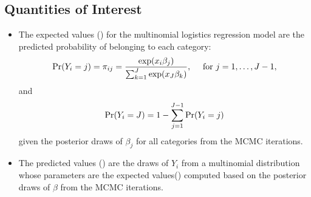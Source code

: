 \documentclass[letterpaper,10pt,english]{sphinxmanual}
\begin{document}
\subsection{Quantities of Interest}
\label{vignette:id87}\begin{itemize}
\item {} 
The expected values () for the multinomial logistics
regression model are the predicted probability of belonging to each
category:
\begin{gather}
\begin{split}\begin{aligned}
\Pr(Y_i=j)=\pi_{ij}=\frac{\exp(x_i \beta_j)}{\sum_{k=1}^J \exp(x_J
\beta_k)}, \quad \textrm{ for } j=1,\ldots, J-1,\end{aligned}\end{split}\notag
\end{gather}
and
\begin{gather}
\begin{split}\begin{aligned}
\Pr(Y_i=J)=1-\sum_{j=1}^{J-1}\Pr(Y_i=j)\end{aligned}\end{split}\notag
\end{gather}
given the posterior draws of \(\beta_j\) for all categories from
the MCMC iterations.

\item {} 
The predicted values () are the draws of \(Y_i\) from a
multinomial distribution whose parameters are the expected
values() computed based on the posterior draws of
\(\beta\) from the MCMC iterations.


\end{itemize}
\end{document}
